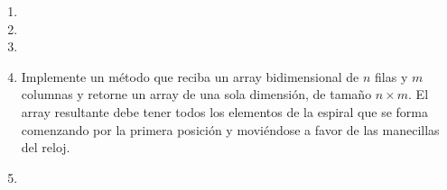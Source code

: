 \begin{enumerate}
    \item
    

    \item
    

    \item
    

    \item
    Implemente un método que reciba un array bidimensional de \(n\) filas y \(m\) columnas y retorne un array de una sola dimensión, de tamaño \(n \times m\). El array resultante debe tener todos los elementos de la espiral que se forma comenzando por la primera posición y moviéndose a favor de las manecillas del reloj.

    \item
    
\end{enumerate}

\newpage
